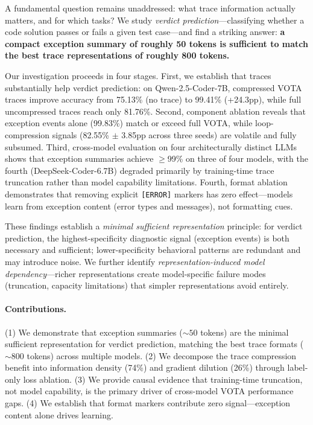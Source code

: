 \documentclass[11pt,a4paper]{article}
\begin{document}
A fundamental question remains unaddressed: what trace information actually matters, and for which tasks?
We study \emph{verdict prediction}---classifying whether a code solution passes or fails a given test case---and find a striking answer: \textbf{a compact exception summary of roughly 50 tokens is sufficient to match the best trace representations of roughly 800 tokens.}

Our investigation proceeds in four stages.
First, we establish that traces substantially help verdict prediction: on Qwen-2.5-Coder-7B, compressed VOTA traces improve accuracy from 75.13\% (no trace) to 99.41\% (+24.3pp), while full uncompressed traces reach only 81.76\%.
Second, component ablation reveals that exception events alone (99.83\%) match or exceed full VOTA, while loop-compression signals (82.55\% $\pm$ 3.85pp across three seeds) are volatile and fully subsumed.
Third, cross-model evaluation on four architecturally distinct LLMs shows that exception summaries achieve $\geq$99\% on three of four models, with the fourth (DeepSeek-Coder-6.7B) degraded primarily by training-time trace truncation rather than model capability limitations.
Fourth, format ablation demonstrates that removing explicit \texttt{[ERROR]} markers has zero effect---models learn from exception content (error types and messages), not formatting cues.

These findings establish a \emph{minimal sufficient representation} principle: for verdict prediction, the highest-specificity diagnostic signal (exception events) is both necessary and sufficient; lower-specificity behavioral patterns are redundant and may introduce noise.
We further identify \emph{representation-induced model dependency}---richer representations create model-specific failure modes (truncation, capacity limitations) that simpler representations avoid entirely.

\paragraph{Contributions.}
(1) We demonstrate that exception summaries (${\sim}50$ tokens) are the minimal sufficient representation for verdict prediction, matching the best trace formats (${\sim}800$ tokens) across multiple models.
(2) We decompose the trace compression benefit into information density (74\%) and gradient dilution (26\%) through label-only loss ablation.
(3) We provide causal evidence that training-time truncation, not model capability, is the primary driver of cross-model VOTA performance gaps.
(4) We establish that format markers contribute zero signal---exception content alone drives learning.
\end{document}
